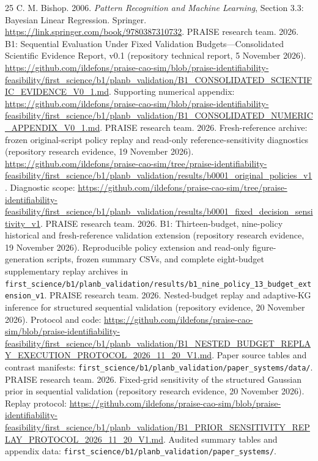 \documentclass[10pt,a4paper]{article}
\newcommand{\method}[1]{\texttt{#1}}
\begin{document}
\begin{thebibliography}{25}
 C. M. Bishop. 2006. \emph{Pattern Recognition and Machine Learning}, Section 3.3: Bayesian Linear Regression. Springer. \url{https://link.springer.com/book/9780387310732}.
 PRAISE research team. 2026. B1: Sequential Evaluation Under Fixed Validation Budgets---Consolidated Scientific Evidence Report, v0.1 (repository technical report, 5 November 2026). \url{https://github.com/ildefons/praise-cao-sim/blob/praise-identifiability-feasibility/first_science/b1/planb_validation/B1_CONSOLIDATED_SCIENTIFIC_EVIDENCE_V0_1.md}. Supporting numerical appendix: \url{https://github.com/ildefons/praise-cao-sim/blob/praise-identifiability-feasibility/first_science/b1/planb_validation/B1_CONSOLIDATED_NUMERIC_APPENDIX_V0_1.md}.
 PRAISE research team. 2026. Fresh-reference archive:
frozen original-script policy replay and read-only reference-sensitivity
diagnostics (repository research evidence, 19 November 2026).
\url{https://github.com/ildefons/praise-cao-sim/tree/praise-identifiability-feasibility/first_science/b1/planb_validation/results/b0001_original_policies_v1}.
Diagnostic scope:
\url{https://github.com/ildefons/praise-cao-sim/tree/praise-identifiability-feasibility/first_science/b1/planb_validation/results/b0001_fixed_decision_sensitivity_v1}.
 PRAISE research team. 2026. B1: Thirteen-budget, nine-policy historical and fresh-reference validation extension (repository research evidence, 19 November 2026). Reproducible policy extension and read-only figure-generation scripts, frozen summary CSVs, and complete eight-budget supplementary replay archives in \method{first\_science/b1/planb\_validation/results/b1\_nine\_policy\_13\_budget\_extension\_v1}.
 PRAISE research team. 2026. Nested-budget replay and adaptive-KG inference for structured sequential validation (repository evidence, 20 November 2026). Protocol and code: \url{https://github.com/ildefons/praise-cao-sim/blob/praise-identifiability-feasibility/first_science/b1/planb_validation/B1_NESTED_BUDGET_REPLAY_EXECUTION_PROTOCOL_2026_11_20_V1.md}. Paper source tables and contrast manifests: \method{first\_science/b1/planb\_validation/paper\_systems/data/}.
 PRAISE research team. 2026. Fixed-grid sensitivity of the structured Gaussian prior in sequential validation (repository research evidence, 20 November 2026). Replay protocol: \url{https://github.com/ildefons/praise-cao-sim/blob/praise-identifiability-feasibility/first_science/b1/planb_validation/B1_PRIOR_SENSITIVITY_REPLAY_PROTOCOL_2026_11_20_V1.md}. Audited summary tables and appendix data: \method{first\_science/b1/planb\_validation/paper\_systems/}.

\end{thebibliography}
\end{document}

